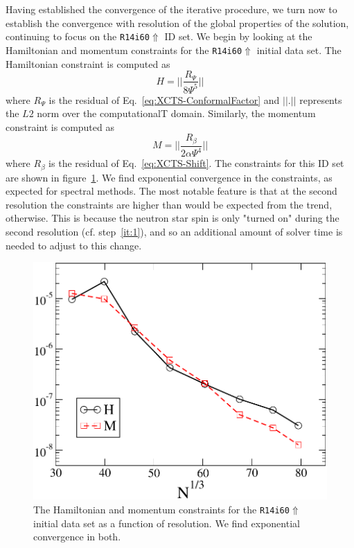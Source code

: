 Having established the convergence of the iterative procedure, we
turn now to establish the convergence with resolution of the global
properties of the solution, continuing to focus on the {\tt R14i60$\Uparrow$} ID set. We begin by looking at the Hamiltonian and momentum constraints for the {\tt R14i60$\Uparrow$} initial data set.
The Hamiltonian constraint is computed as
\begin{equation}
H=||\frac{R_{\Psi}}{8\Psi^5}||
\end{equation}
where $R_{\Psi}$ is the residual of Eq.~\ref{eq:XCTS-ConformalFactor}
and $||.||$ represents the $L2$ norm over the computationalT
domain. Similarly, the momentum constraint is computed as
\begin{equation}
M = ||\frac{R_{\beta}}{2\alpha\Psi^4}||
\end{equation}
where $R_{\beta}$ is the residual of Eq.~\ref{eq:XCTS-Shift}.
The constraints for this ID set are shown in figure~\ref{fig:HamMom}. We find exponential convergence in the constraints, as expected for spectral methods. The most notable feature
is that at the second resolution the constraints are higher than would be expected
from the trend, otherwise. This is because the neutron star spin is
only "turned on" during the second resolution (cf. step~\ref{it:1}), and so an additional amount of
solver time is needed to adjust to this change.
\begin{figure}\includegraphics[width=0.95\columnwidth]{chap4/HamMom}
\caption[Hamiltonian and momentum constraints of the {\tt R14i60$\Uparrow$} ID set]{\label{fig:HamMom} The Hamiltonian and momentum constraints for the {\tt R14i60$\Uparrow$} initial data set
as a function of resolution. We find exponential convergence in both.}
\end{figure}

